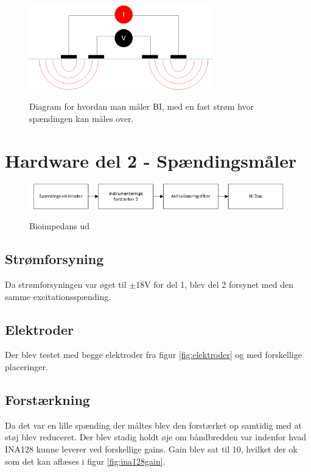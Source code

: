 \begin{figure}[H]
\centering
{\includegraphics[width=8cm]
{Figure/BIbasic}}
\caption{Diagram for hvordan man måler BI, med en fast strøm hvor spændingen kan måles over.}
\label{fig:analyse2}
\end{figure}


\section{Hardware del 2 - Spændingsmåler}
\begin{figure}[H]
\centering
{\includegraphics[width=\linewidth]
{Figure/analyse2}}
\caption{Bioimpedans ud}
\label{fig:analyse2}
\end{figure}


\subsection{Strømforsyning}

Da strømforsyningen var øget til $\pm$18V for del 1, blev del 2 forsynet med den samme excitationsspænding. 

\subsection{Elektroder}

Der blev testet med begge elektroder fra figur \ref{fig:elektroder} og med forskellige placeringer.

\subsection{Forstærkning}
Da det var en lille spænding der måltes blev den forstærket op samtidig med at støj blev reduceret. Der blev stadig holdt øje om båndbredden var indenfor hvad INA128 kunne leverer ved forskellige gains. Gain blev sat til 10, hvilket der ok som det kan aflæses i figur \ref{fig:ina128gain}.



